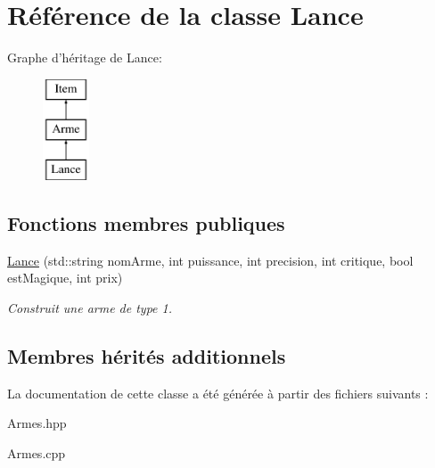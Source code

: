 \hypertarget{classLance}{\section{Référence de la classe Lance}
\label{classLance}
}
Graphe d'héritage de Lance\-:\begin{figure}[H]
\begin{center}
\leavevmode
\includegraphics[height=3.000000cm]{classLance}
\end{center}
\end{figure}
\subsection*{Fonctions membres publiques}
\begin{DoxyCompactItemize}
\item 
\hypertarget{classLance_aafa988062f9318f245741be0b5307fe5}{\hyperlink{classLance_aafa988062f9318f245741be0b5307fe5}{Lance} (std\-::string nom\-Arme, int puissance, int precision, int critique, bool est\-Magique, int prix)}\label{classLance_aafa988062f9318f245741be0b5307fe5}

\begin{DoxyCompactList}\small\item\em Construit une arme de type 1. \end{DoxyCompactList}\end{DoxyCompactItemize}
\subsection*{Membres hérités additionnels}


La documentation de cette classe a été générée à partir des fichiers suivants \-:\begin{DoxyCompactItemize}
\item 
Armes.\-hpp\item 
Armes.\-cpp\end{DoxyCompactItemize}
